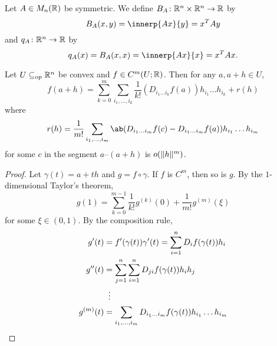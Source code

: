 \begin{definition} \label{def:quadform}
    Let $A \in M_n(\mathbb{R})$ be symmetric.
    We define $B_A\colon \mathbb{R}^n \times \mathbb{R}^n \to \mathbb{R}$ by \[
        B_A(x, y) = \innerp{Ax}{y} = x^T A y
    \] and $q_A\colon \mathbb{R}^n \to \mathbb{R}$ by \[
        q_A(x) = B_A(x, x) = \innerp{Ax}{x} = x^T A x.
    \]
\end{definition}

\begin{theorem} \label{thm:taylor}
    Let $U \subseteq_{\mathrm{op}} \mathbb{R}^n$ be convex and $f \in C^m(U; \mathbb{R})$.
    Then for any $a, a + h \in U$, \[
        f(a + h) = \sum_{k=0}^m \sum_{i_1, \dots, i_k} \frac1{k!}
            (D_{i_1 \dots i_k} f(a)) h_{i_1} \dots h_{i_k}
            + r(h)
    \] where \[
        r(h) = \frac1{m!} \sum_{i_1, \dots, i_m} \ab(
                D_{i_1 \dots i_m} f(c) - D_{i_1 \dots i_m} f(a)
            ) h_{i_1} \dots h_{i_m}
    \] for some $c$ in the segment $a$--$(a + h)$ is $o(\lVert h\rVert^m)$.
\end{theorem}
\begin{proof}
    Let $\gamma(t) = a + th$ and $g = f \circ \gamma$.
    If $f$ is $C^m$, then so is $g$.
    By the $1$-dimensional Taylor's theorem, \[
        g(1) = \sum_{k=0}^{m-1} \frac1{k!} g^{(k)}(0)
            + \frac1{m!} g^{(m)}(\xi)
    \] for some $\xi \in (0, 1)$.
    By the composition rule, \begin{align*}
        g'(t) &= f'(\gamma(t)) \gamma'(t)
            = \sum_{i=1}^n D_i f(\gamma(t)) h_i \\
        g''(t) &= \sum_{j=1}^n \sum_{i=1}^n D_{ji} f(\gamma(t)) h_i h_j \\
            &\mathrel{\makebox[\widthof{=}]{\vdots}} \\
        g^{(m)}(t) &= \sum_{i_1, \dots, i_m} D_{i_1 \dots i_m} f(\gamma(t))
            h_{i_1} \dots h_{i_m} \qedhere
    \end{align*}
\end{proof}
